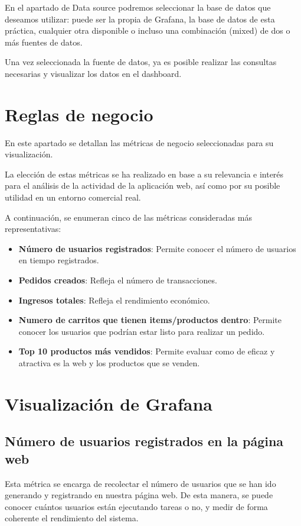 \documentclass[10pt]{book}
\begin{document}
En el apartado de Data source podremos seleccionar la base de datos que deseamos utilizar: puede ser la propia de Grafana, la base de datos de esta práctica, cualquier otra disponible o incluso una combinación (mixed) de dos o más fuentes de datos.

Una vez seleccionada la fuente de datos, ya es posible realizar las consultas necesarias y visualizar los datos en el dashboard.

\section{Reglas de negocio} \cite{metricas_boske}
En este apartado se detallan las métricas de negocio seleccionadas para su visualización.

La elección de estas métricas se ha realizado en base a su relevancia e interés para el análisis de la actividad de la aplicación web, así como por su posible utilidad en un entorno comercial real.

A continuación, se enumeran cinco de las métricas consideradas más representativas:
\begin{itemize}
    \item \textbf{Número de usuarios registrados}: Permite conocer el número de usuarios en tiempo registrados.
    \item \textbf{Pedidos creados}: Refleja el número de transacciones. 
    \item \textbf{Ingresos totales}: Refleja el rendimiento económico.
    \item \textbf{Numero de carritos que tienen items/productos dentro}: Permite conocer los usuarios que podrían estar listo para realizar un pedido.
    \item \textbf{Top 10 productos más vendidos}: Permite evaluar como de eficaz y atractiva es la web y los productos que se venden.
\end{itemize}

\section{Visualización de Grafana}\label{sec:visualizacion}
\subsection*{Número de usuarios registrados en la página web}

Esta métrica se encarga de recolectar el número de usuarios que se han ido generando y registrando en nuestra página web. De esta manera, se puede conocer cuántos usuarios están ejecutando tareas o no, y medir de forma coherente el rendimiento del sistema.
\end{document}
